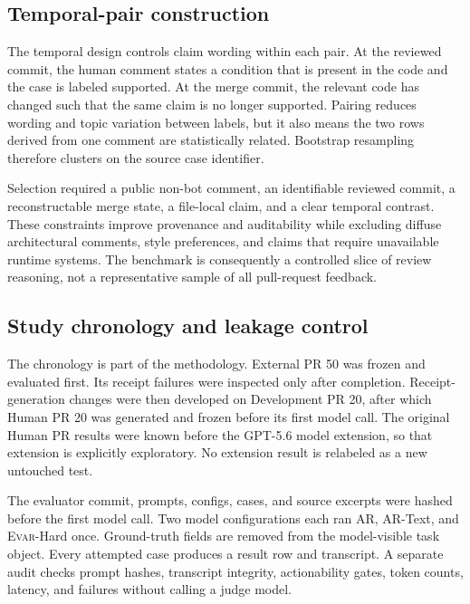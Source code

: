 \documentclass[acmsmall,screen,review,anonymous]{acmart}
\newcommand{\evar}{\textsc{Evar}\xspace}
\begin{document}
\subsection{Temporal-pair construction}

The temporal design controls claim wording within each pair. At the reviewed commit, the human comment states a condition that is present in the code and the case is labeled supported. At the merge commit, the relevant code has changed such that the same claim is no longer supported. Pairing reduces wording and topic variation between labels, but it also means the two rows derived from one comment are statistically related. Bootstrap resampling therefore clusters on the source case identifier.

Selection required a public non-bot comment, an identifiable reviewed commit, a reconstructable merge state, a file-local claim, and a clear temporal contrast. These constraints improve provenance and auditability while excluding diffuse architectural comments, style preferences, and claims that require unavailable runtime systems. The benchmark is consequently a controlled slice of review reasoning, not a representative sample of all pull-request feedback.

\subsection{Study chronology and leakage control}

The chronology is part of the methodology. External PR 50 was frozen and evaluated first. Its receipt failures were inspected only after completion. Receipt-generation changes were then developed on Development PR 20, after which Human PR 20 was generated and frozen before its first model call. The original Human PR results were known before the GPT-5.6 model extension, so that extension is explicitly exploratory. No extension result is relabeled as a new untouched test.

The evaluator commit, prompts, configs, cases, and source excerpts were hashed before the first model call. Two model configurations each ran AR, AR-Text, and \evar-Hard once. Ground-truth fields are removed from the model-visible task object. Every attempted case produces a result row and transcript. A separate audit checks prompt hashes, transcript integrity, actionability gates, token counts, latency, and failures without calling a judge model.
\end{document}
